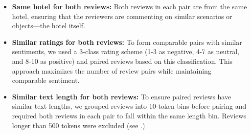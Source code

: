 \begin{itemize}[leftmargin=*]
\item
\textbf{Same hotel for both reviews:} 
Both reviews in each pair are from the same hotel, ensuring that the reviewers are commenting on similar scenarios or objects---the hotel itself.



\vspace{-.5pc}

    
\item
\textbf{Similar ratings for both reviews:} 
To form comparable pairs with similar sentiments, we used a 3-class rating scheme (1-3 as negative, 4-7 as neutral, and 8-10 as positive) and paired reviews based on this classification. 
This approach maximizes the number of review pairs while maintaining comparable sentiment.



\vspace{-.5pc}

\item
\textbf{Similar text length for both reviews:} 
To ensure paired reviews have similar text lengths, we grouped reviews into 10-token bins before pairing and required both reviews in each pair to fall within the same length bin.
Reviews longer than 500 tokens were excluded (see .)


\end{itemize}



